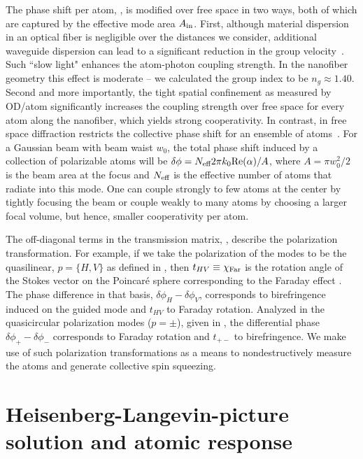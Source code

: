 \documentclass[preprint, aps,pra,onecolumn]{revtex4-1} %
\begin{document}
The phase shift per atom, , is modified over free space in two ways, both of which are captured by the effective mode area $A_{\rm in}$. First, although material dispersion in an optical fiber is negligible over the distances we consider, additional waveguide dispersion can lead to a significant reduction in the group velocity~\cite{hung_trapped_2013,goban_atomlight_2014}.  Such ``slow light" enhances the atom-photon coupling strength. 
In the nanofiber geometry this effect is moderate -- we calculated the group index to be $n_g \approx 1.40$. 
Second and more importantly, the tight spatial confinement as measured by OD/atom significantly increases the coupling strength over free space for every atom along the nanofiber, which yields strong cooperativity.
In contrast, in free space diffraction restricts the collective phase shift for an ensemble of atoms~\cite{tanji-suzuki_chapter_2011, baragiola_three-dimensional_2014}.  
For a Gaussian beam with beam waist $w_0$, the total phase shift induced by a collection of polarizable atoms will be $\delta \phi = N_{\text{eff}} 2 \pi k_0 {\rm Re}({\alpha})/A$, where $A = \pi w^2_0/2$ is the beam area at the focus and $N_{\text{eff}}$ is the effective number of atoms that radiate into this mode.  
One can couple strongly to few atoms at the center by tightly focusing the beam or couple weakly to many atoms by choosing a larger focal volume, but hence, smaller cooperativity per atom.  

The off-diagonal terms in the transmission matrix, , describe the polarization transformation. For example, if we take the polarization of the modes to be the quasilinear, $p = \{H,V\}$ as defined in , then $t_{HV} \equiv \chi_{\rm Far}$ is the rotation angle of the Stokes vector on the Poincar\'{e} sphere corresponding to the Faraday effect \cite{hammerer_quantum_2010, deutsch_quantum_2010}.  
The phase difference in that basis, $\delta  \phi_H - \delta \phi_V$, corresponds to birefringence induced on the guided mode and $t_{HV}$ to Faraday rotation.  
Analyzed in the quasicircular polarization modes ($p=\pm$), given in , the differential phase $\delta \phi_+ -\delta  \phi_-$ corresponds to Faraday rotation and $t_{+-}$ to birefringence.  
We make use of such polarization transformations as a means to nondestructively measure the atoms and generate collective spin squeezing.

	
\section{Heisenberg-Langevin-picture solution and atomic response} \label{Sec::HeisenbergLangevin}
	
\end{document}
